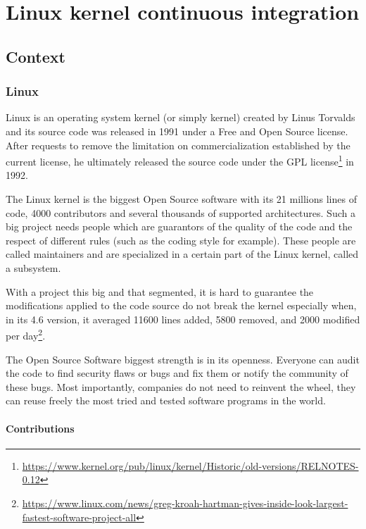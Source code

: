\chapter{Linux kernel continuous integration}
\section{Context}
\subsection{Linux}
Linux is an operating system kernel (or simply kernel) created by Linus Torvalds and its source code was released in 1991 under a Free and Open Source license. After requests to remove the limitation on commercialization established by the current license, he ultimately released the source code under the GPL license\footnote{\url{https://www.kernel.org/pub/linux/kernel/Historic/old-versions/RELNOTES-0.12}} in 1992.

The Linux kernel is the biggest Open Source software with its 21 millions lines of code, 4000 contributors and several thousands of supported architectures. Such a big project needs people which are guarantors of the quality of the code and the respect of different rules (such as the coding style for example). These people are called maintainers and are specialized in a certain part of the Linux kernel, called a subsystem.

With a project this big and that segmented, it is hard to guarantee the modifications applied to the code source do not break the kernel especially when, in its 4.6 version, it averaged 11600 lines added, 5800 removed, and 2000 modified per day\footnote{\url{https://www.linux.com/news/greg-kroah-hartman-gives-inside-look-largest-fastest-software-project-all}}.

The Open Source Software biggest strength is in its openness. Everyone can audit the code to find security flaws or bugs and fix them or notify the community of these bugs. Most importantly, companies do not need to reinvent the wheel, they can reuse freely the most tried and tested software programs in the world.

\subsubsection{Contributions}

